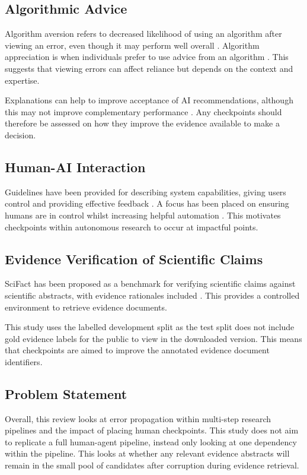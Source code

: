\documentclass[11pt,a4paper]{article}
\begin{document}
\subsection{Algorithmic Advice}

Algorithm aversion refers to decreased likelihood of using an algorithm after viewing an error, even though it may perform well overall \citep{dietvorst2015}. Algorithm appreciation is when individuals prefer to use advice from an algorithm \citep{logg2019}. This suggests that viewing errors can affect reliance but depends on the context and expertise.

Explanations can help to improve acceptance of AI recommendations, although this may not improve complementary performance \citep{bansal2021}. Any checkpoints should therefore be assessed on how they improve the evidence available to make a decision.

\subsection{Human-AI Interaction}

Guidelines have been provided for describing system capabilities, giving users control and providing effective feedback \citep{amershi2019}. A focus has been placed on ensuring humans are in control whilst increasing helpful automation \citep{shneiderman2022}. This motivates checkpoints within autonomous research to occur at impactful points.

\subsection{Evidence Verification of Scientific Claims}

SciFact has been proposed as a benchmark for verifying scientific claims against scientific abstracts, with evidence rationales included \citep{wadden2020}. This provides a controlled environment to retrieve evidence documents.

This study uses the labelled development split as the test split does not include gold evidence labels for the public to view in the downloaded version. This means that checkpoints are aimed to improve the annotated evidence document identifiers.

\subsection{Problem Statement}

Overall, this review looks at error propagation within multi-step research pipelines and the impact of placing human checkpoints. This study does not aim to replicate a full human-agent pipeline, instead only looking at one dependency within the pipeline. This looks at whether any relevant evidence abstracts will remain in the small pool of candidates after corruption during evidence retrieval.
\end{document}
